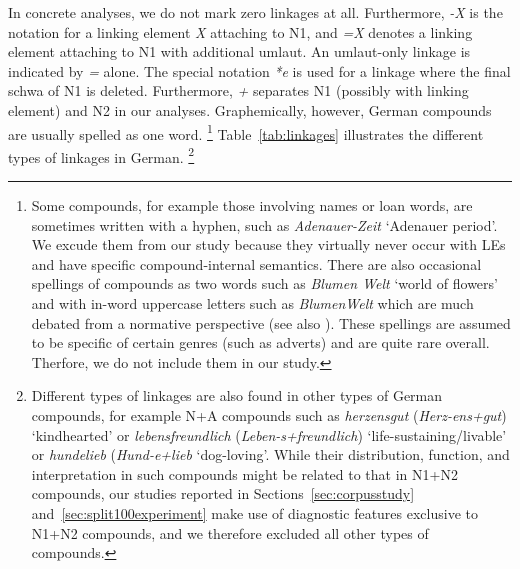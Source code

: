 In concrete analyses, we do not mark zero linkages at all.
Furthermore, \textit{-X} is the notation for a linking element \textit{X} attaching to N1, and \textit{=X} denotes a linking element attaching to N1 with additional umlaut.
An umlaut-only linkage is indicated by \textit{=} alone.
The special notation \textit{*e} is used for a linkage where the final schwa of N1 is deleted.
Furthermore, \textit{+} separates N1 (possibly with linking element) and N2 in our analyses.
Graphemically, however, German compounds are usually spelled as one word.%
\footnote{Some compounds, for example those involving names or loan words, are sometimes written with a hyphen, such as \textit{Adenauer-Zeit} `Adenauer period'.
We excude them from our study because they virtually never occur with LEs and have specific compound-internal semantics.
There are also occasional spellings of compounds as two words such as \textit{Blumen Welt} `world of flowers' and with in-word uppercase letters such as \textit{BlumenWelt} which are much debated from a normative perspective (see also \citealt{Scherer2012}).
These spellings are assumed to be specific of certain genres (such as adverts) and are quite rare overall.
Therfore, we do not include them in our study.}
Table~\ref{tab:linkages} illustrates the different types of linkages in German.%
\footnote{Different types of linkages are also found in other types of German compounds, for example N+A compounds such as \textit{herzensgut} (\textit{Herz-ens+gut}) `kindhearted' or \textit{lebensfreundlich} (\textit{Leben-s+freundlich}) `life-sustaining\slash livable' or \textit{hundelieb} (\textit{Hund-e+lieb} `dog-loving'.
While their distribution, function, and interpretation in such compounds might be related to that in N1+N2 compounds, our studies reported in Sections~\ref{sec:corpusstudy} and~\ref{sec:split100experiment} make use of diagnostic features exclusive to N1+N2 compounds, and we therefore excluded all other types of compounds.}


